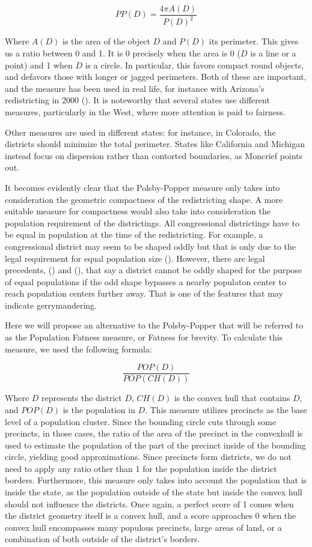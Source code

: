 \documentclass[letterpaper]{article}
\begin{document}
\[
	PP(D) = \frac{4\pi A(D)}{P(D)^2}
\]


Where $A(D)$ is the area of the object $D$ and $P(D)$ its perimeter. This gives us a ratio between 0 and 1. It is 0 precisely when the area is 0 ($D$ is a line or a point) and 1 when $D$ is a circle. In particular, this favors compact round objects, and defavors those with longer or jagged perimeters. Both of these are important, and the measure has been used in real life, for instance with Arizona’s redistricting in 2000 (\cite{moncrief}). It is noteworthy that several states use different measures, particularly in the West, where more attention is paid to fairness.

Other measures are used in different states: for instance, in Colorado, the districts should minimize the total perimeter. States like California and Michigan instead focus on dispersion rather than contorted boundaries, as Moncrief points out. 

It becomes evidently clear that the Polsby-Popper measure only takes into consideration the geometric compactness of the redistricting shape. A more suitable measure for compactness would also take into consideration the population requirement of the districtings. All congressional districtings have to be equal in population at the time of the redistricting. For example, a congressional district may seem to be shaped oddly but that is only due to the legal requirement for equal population size (\cite{westberryVsanders}). However, there are legal precedents, (\cite{sandiego}) and (\cite{california}), that say a district cannot be oddly shaped for the purpose of equal populations if the odd shape bypasses a nearby populaton center to reach population centers further away. That is one of the features that may indicate gerrymandering.

Here we will propose an alternative to the Polsby-Popper that will be referred to as the Population Fatness measure, or Fatness for brevity. To calculate this measure, we used the following formula:

\[
	\frac{POP(D)}{POP(CH(D))}
\]

Where $D$ represents the district $D$, $CH(D)$ is the convex hull that contains $D$, and $POP(D)$ is the population in $D$. This measure utilizes precincts as the base level of a population cluster. Since the bounding circle cuts through some precincts, in those cases, the ratio of the area of the precinct in the convexhull is used to estimate the population of the part of the precinct inside of the bounding circle, yielding good approximations. Since precincts form districts, we do not need to apply any ratio other than 1 for the population inside the district borders. Furthermore, this measure only takes into account the population that is inside the state, as the population outside of the state but inside the convex hull should not influence the districts. Once again, a perfect score of 1 comes when the district geometry itself is a convex hull, and a score approaches 0 when the convex hull encompasses many populous precincts, large areas of land, or a combination of both outside of the district's borders.
\end{document}
